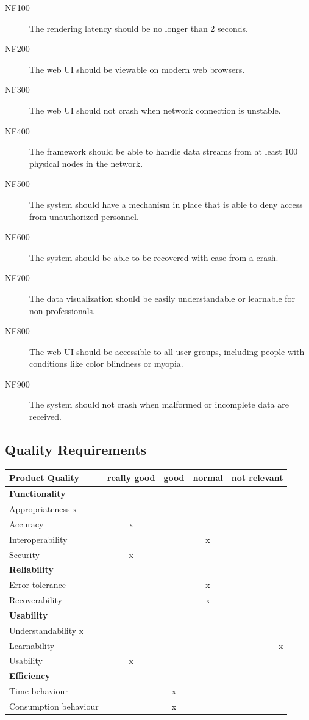 \documentclass[twoside, english, draft]{Pflichtenheft}
\begin{document}
\begin{description}

  \item[NF100]
  The rendering latency should be no longer than 2 seconds.

  \item[NF200]
  The web UI should be viewable on modern web browsers.

  \item[NF300]
	The web UI should not crash when network connection is unstable.
	
  \item[NF400]
  The framework should be able to handle \glspl{data stream} from at least 100 physical nodes in the network.
	
	\item[NF500]
	The system should have a mechanism in place that is able to deny access from unauthorized personnel.

	\item[NF600]
	The system should be able to be recovered with ease from a crash.

	\item[NF700]
	The data visualization should be easily understandable or learnable for non-professionals.

	\item[NF800]
	The web UI should be accessible to all user groups, including people with conditions like color blindness or myopia.

	\item[NF900]
	The system should not crash when malformed or incomplete data are received.

\end{description}
\subsection{Quality Requirements}

\begin{tabular}{l*{3}{c}r}
Product Quality              & really good & good & normal & not relevant  \\
\hline
\textbf{Functionality} &  &  &  &    \\
Appropriateness x & & & & \\
Accuracy  & x & & & \\
Interoperability & & & x & \\
Security & x & & & \\
\textbf{Reliability} &  &  &  &    \\
Error tolerance & & & x & \\
Recoverability & & & x & \\
\textbf{Usability} &  &  &  &    \\
Understandability x & & & & \\
Learnability & & & & x \\
Usability & x & & & \\

\textbf{Efficiency} &  &  &  &    \\
Time behaviour & & x & & \\
Consumption behaviour & & x & & \\
\end{tabular}
\end{document}
